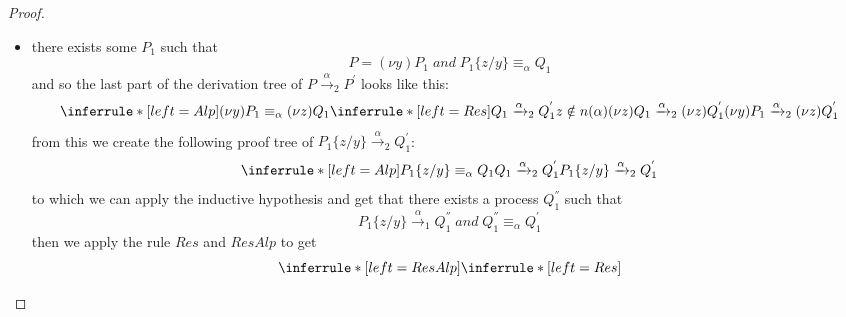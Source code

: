 \begin{theorem}
\begin{proof}
\begin{description}
\begin{description}
\begin{itemize}
\[{		    \\
		      \inferrule* [left=Res]{
			  Q_{1}\xrightarrow{\alpha}_{2}Q_{1}^{'}
			\\
			  z\notin n(\alpha)
		      }{
			(\nu z)Q_{1}\xrightarrow{\alpha}_{2}(\nu z)Q_{1}^{'}
		      }
		  }{
		    (\nu z)P_{1}\xrightarrow{\alpha}_{2}(\nu z)Q_{1}^{'}
		  }
		\]
		from this we create the following proof tree of $P_{1}\xrightarrow{\alpha}_{2}Q_{1}^{'}$:
		\[
		  \inferrule* [left=Alp]{
		      P_{1}\equiv_{\alpha}Q_{1}
		    \\
		      Q_{1}\xrightarrow{\alpha}_{2}Q_{1}^{'}
		  }{
		    P_{1}\xrightarrow{\alpha}_{2}Q_{1}^{'}
		  }		
		\]
		to which we can apply the inductive hypothesis and get that there exists a process $Q_{1}^{''}$ such that
		\[
		  P_{1}\xrightarrow{\alpha}_{1}Q_{1}^{''}\;and\; Q_{1}^{''}\equiv_{\alpha}Q_{1}^{'}
		\]
		then we apply the rule $Res$ to get
		\[
		      \inferrule* [left=Res]{
			  P_{1}\xrightarrow{\alpha}_{1}Q_{1}^{''}
			\\
			  z\notin n(\alpha)
		      }{
			(\nu z)P_{1}\xrightarrow{\alpha}_{1}(\nu z)Q_{1}^{''}
		      }		 
		\]
		this satisfies the thesis of the theorem because  
		\[
		  (\nu z)Q_{1}^{''}\equiv(\nu z)Q_{1}^{'}
		\]
	      \item
		there exists some $P_{1}$ such that 
		\[
		  P=(\nu y)P_{1}\; and\; P_{1}\{z/y\}\equiv_{\alpha}Q_{1}
		\]
		and so the last part of the derivation tree of $P\xrightarrow{\alpha}_{2}P^{'}$ looks like this:
		\[
		  \inferrule* [left=Alp]{
		      (\nu y)P_{1}\equiv_{\alpha}(\nu z)Q_{1}
		    \\
		      \inferrule* [left=Res]{
			  Q_{1}\xrightarrow{\alpha}_{2}Q_{1}^{'}
			\\
			  z\notin n(\alpha)
		      }{
			(\nu z)Q_{1}\xrightarrow{\alpha}_{2}(\nu z)Q_{1}^{'}
		      }
		  }{
		    (\nu y)P_{1}\xrightarrow{\alpha}_{2}(\nu z)Q_{1}^{'}
		  }
		\]
		from this we create the following proof tree of $P_{1}\{z/y\}\xrightarrow{\alpha}_{2}Q_{1}^{'}$:
		\[
		  \inferrule* [left=Alp]{
		      P_{1}\{z/y\}\equiv_{\alpha}Q_{1}
		    \\
		      Q_{1}\xrightarrow{\alpha}_{2}Q_{1}^{'}
		  }{
		    P_{1}\{z/y\}\xrightarrow{\alpha}_{2}Q_{1}^{'}
		  }		
		\]
		to which we can apply the inductive hypothesis and get that there exists a process $Q_{1}^{''}$ such that
		\[
		  P_{1}\{z/y\}\xrightarrow{\alpha}_{1}Q_{1}^{''}\;and\; Q_{1}^{''}\equiv_{\alpha}Q_{1}^{'}
		\]
		then we apply the rule $Res$ and $ResAlp$ to get
		\[
		  \inferrule* [left=ResAlp]{
		      \inferrule* [left=Res]{
}}\]
\end{itemize}
\end{description}
\end{description}
\end{proof}
\end{theorem}
